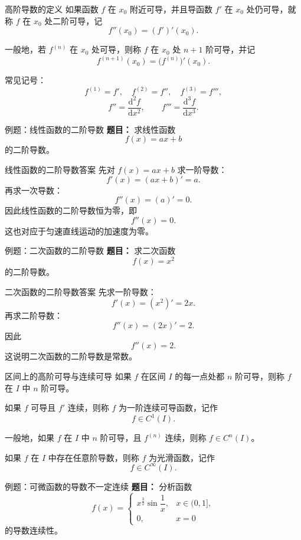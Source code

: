 ﻿\documentclass[aspectratio=169,11pt]{ctexbeamer}
\begin{document}
\begin{frame}{高阶导数的定义}
\small
如果函数 $f$ 在 $x_0$ 附近可导，并且导函数 $f'$ 在 $x_0$ 处仍可导，就称 $f$ 在 $x_0$ 处二阶可导，记
\[
f''(x_0)=(f')'(x_0).
\]

一般地，若 $f^{(n)}$ 在 $x_0$ 处可导，则称 $f$ 在 $x_0$ 处 $n+1$ 阶可导，并记
\[
f^{(n+1)}(x_0)=\bigl(f^{(n)}\bigr)'(x_0).
\]

\vspace{0.5em}
常见记号：
\[
f^{(1)}=f',\quad f^{(2)}=f'',\quad f^{(3)}=f''',
\]
\[
f''=\frac{\mathrm d^2f}{\mathrm dx^2},\qquad
f'''=\frac{\mathrm d^3f}{\mathrm dx^3}.
\]
\end{frame}

\begin{frame}{例题：线性函数的二阶导数}
\small
\textbf{题目：} 求线性函数
\[
f(x)=ax+b
\]
的二阶导数。
\end{frame}

\begin{frame}{线性函数的二阶导数答案}
\small
先对 $f(x)=ax+b$ 求一阶导数：
\[
f'(x)=(ax+b)'=a.
\]
再求一次导数：
\[
f''(x)=(a)'=0.
\]
因此线性函数的二阶导数恒为零，即
\[
f''(x)=0.
\]
这也对应于匀速直线运动的加速度为零。
\end{frame}

\begin{frame}{例题：二次函数的二阶导数}
\small
\textbf{题目：} 求二次函数
\[
f(x)=x^2
\]
的二阶导数。
\end{frame}

\begin{frame}{二次函数的二阶导数答案}
\small
先求一阶导数：
\[
f'(x)=(x^2)'=2x.
\]
再求二阶导数：
\[
f''(x)=(2x)'=2.
\]
因此
\[
f''(x)=2.
\]
这说明二次函数的二阶导数是常数。
\end{frame}

\begin{frame}{区间上的高阶可导与连续可导}
\small
如果 $f$ 在区间 $I$ 的每一点处都 $n$ 阶可导，则称 $f$ 在 $I$ 中 $n$ 阶可导。

\vspace{0.5em}
如果 $f$ 可导且 $f'$ 连续，则称 $f$ 为一阶连续可导函数，记作
\[
f\in C^1(I).
\]

一般地，如果 $f$ 在 $I$ 中 $n$ 阶可导，且 $f^{(n)}$ 连续，则称 $f\in C^n(I)$。

\vspace{0.5em}
如果 $f$ 在 $I$ 中存在任意阶导数，则称 $f$ 为\alert{光滑函数}，记作
\[
f\in C^\infty(I).
\]
\end{frame}

\begin{frame}{例题：可微函数的导数不一定连续}
\small
\textbf{题目：} 分析函数
\[
f(x)=
\begin{cases}
x^{\frac32}\sin\dfrac1x,&x\in(0,1],\\
0,&x=0
\end{cases}
\]
的导数连续性。
\end{frame}
\end{document}
